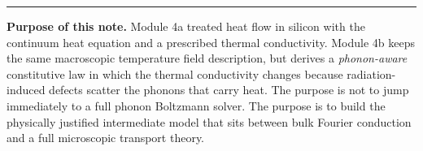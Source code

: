 \documentclass[11pt]{article}
\begin{document}

\hrule
\vspace{0.8em}

\begin{overviewbox}
\textbf{Purpose of this note.} Module 4a treated heat flow in silicon with the continuum heat equation and a prescribed thermal conductivity. Module 4b keeps the same macroscopic temperature field description, but derives a \emph{phonon-aware} constitutive law in which the thermal conductivity changes because radiation-induced defects scatter the phonons that carry heat. The purpose is not to jump immediately to a full phonon Boltzmann solver. The purpose is to build the physically justified intermediate model that sits between bulk Fourier conduction and a full microscopic transport theory.
\end{overviewbox}

\ProjectTOC
\end{document}
